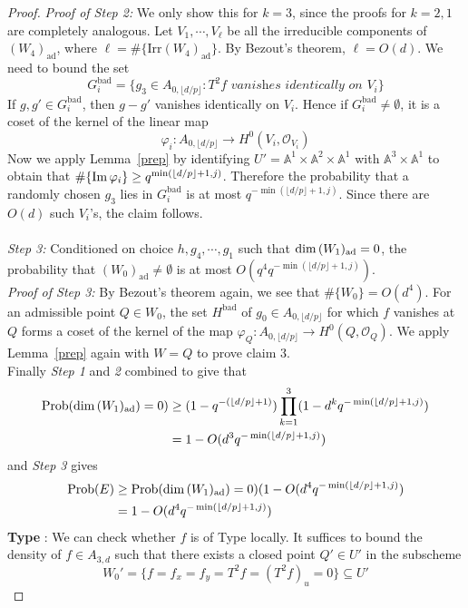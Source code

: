 \documentclass[12pt]{article}
\theoremstyle{plain}
\theoremstyle{definition}
\newcommand{\IA}{\mathbb{A}}
\newcommand{\sO}{\mathcal{O}}
\renewcommand\dim{{\rm dim\,}}
\newcommand{\im}{{\rm Im\,}}
\newcommand{\<}{\langle}
\renewcommand{\>}{\rangle}
\newcommand{\Prob}{\mathrm{Prob}}
\newcommand{\ad}{\mathrm{ad}}
\newcommand{\yk}{\lfloor d/p \rfloor}
\newcommand{\Irr}{\mathrm{Irr}}
\begin{document}
\begin{proof}
\textit{Proof of Step 2: }We only show this for $k = 3$, since the proofs for $k = 2, 1$ are completely analogous. Let $V_1, \cdots, V_\ell$ be all the irreducible components of $(W_4)_\ad$, where $\ell = \# \{\Irr (W_4)_\ad \}$. By Bezout's theorem, $\ell = O(d)$. We need to bound the set 
$$ G_i^{\mathrm{bad}} = \{ g_3 \in A_{0, \yk} : T^2 f \textit{ vanishes identically on }V_i \} $$ 
If $g, g' \in G_i^{\mathrm{bad}}$, then $g - g'$ vanishes identically on $V_i$. Hence if $G_i^{\mathrm{bad}} \neq \emptyset$, it is a coset of the kernel of the linear map 
$$ \varphi_i : A_{0, \yk} \to H^0(V_i, \sO_{V_i}) $$ 
Now we apply Lemma~\ref{prep} by identifying $U' = \IA^1 \times \IA^2 \times \IA^1$ with $\IA^3 \times \IA^1$ to obtain that $\# \{ \im \varphi_i \} \ge q^{\min(\yk + 1, j)}$. Therefore the probability that a randomly chosen $g_3$ lies in $G_i^{\mathrm{bad}}$ is at most  $q^{- \min(\yk + 1, j)}$. Since there are $O(d)$ such $V_i$'s, the claim follows. \\\\
\textit{Step 3: }Conditioned on choice $h, g_4, \cdots, g_1$ such that $\dim (W_1)_\ad = 0$, the probability that $(W_0)_\ad \neq \emptyset$ is at most $O(q^4 q^{- \min(\yk + 1, j)})$. \\
\textit{Proof of Step 3:} By Bezout's theorem again, we see that $\# \{ W_0 \} = O(d^4)$. For an admissible point $Q \in W_0$, the set $H^{\mathrm{bad}}$ of $g_0 \in A_{0, \yk}$ for which $f$ vanishes at $Q$ forms a coset of the kernel of the map $\varphi_Q : A_{0, \yk} \to H^0(Q, \sO_Q)$. We apply Lemma~\ref{prep} again with $W = Q$ to prove claim 3. \\
Finally \textit{Step 1} and \textit{2} combined to give that 
\begin{align*}
\Prob(\dim (W_1)_\ad) = 0) &\ge (1 - q^{-(\yk + 1)})\prod_{k = 1}^3 (1 - d^k q^{- \min(\yk + 1, j)}) \\
&= 1 - O(d^3 q^{- \min(\yk + 1, j)})
\end{align*}
and \textit{Step 3} gives 
\begin{align*}
\Prob(E) &\ge \Prob(\dim (W_1)_\ad) = 0)( 1 - O(d^4 q^{- \min(\yk + 1, j)}) \\ 
&= 1 - O(d^4 q^{- \min(\yk + 1, j)})
\end{align*}
\textbf{Type \uppercase\expandafter{}}: We can check whether $f$ is of Type \uppercase\expandafter{} locally. It suffices to bound the density of $f \in A_{3, d}$ such that there exists a closed point $Q' \in U'$ in the subscheme 
$$ W_0' = \{ f = f_x = f_y = T^2 f = (T^2 f)_u = 0 \} \subseteq U' $$

\end{proof}
\end{document}
